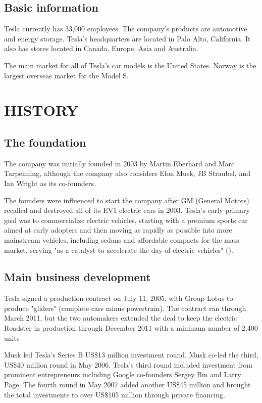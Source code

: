 \documentclass[12pt]{article}
\begin{document}
\subsection{Basic information}
Tesla currently has 33,000 employees. The company's products are automotive and energy storage. Tesla's headquarters are located in Palo Alto, California. It also has stores located in Canada, Europe, Asia and Australia.

The main market for all of Tesla's car models is the United States. Norway is the largest overseas market for the Model S.

\section{HISTORY}

\subsection{The foundation}
The company was initially founded in 2003 by Martin Eberhard and Marc Tarpenning, although the company also considers Elon Musk, JB Straubel, and Ian Wright as its co-founders.

The founders were influenced to start the company after GM (General Motors) recalled and destroyed all of its EV1 electric cars in 2003. Tesla's early primary goal was to commercialize electric vehicles, starting with a premium sports car aimed at early adopters and then moving as rapidly as possible into more mainstream vehicles, including sedans and affordable compacts for the mass market, serving "as a catalyst to accelerate the day of electric vehicles" (\cite{bry16}).

\subsection{Main business development}
Tesla signed a production contract on July 11, 2005, with Group Lotus to produce "gliders" (complete cars minus powertrain). The contract ran through March 2011, but the two automakers extended the deal to keep the electric Roadster in production through December 2011 with a minimum number of 2,400 units

Musk led Tesla's Series B US\$13 million investment round. Musk co-led the third, US\$40 million round in May 2006. Tesla's third round included investment from prominent entrepreneurs including Google co-founders Sergey Bin and Larry Page. The fourth round in May 2007 added another US\$45 million and brought the total investments to over US\$105 million through private financing.
\end{document}
